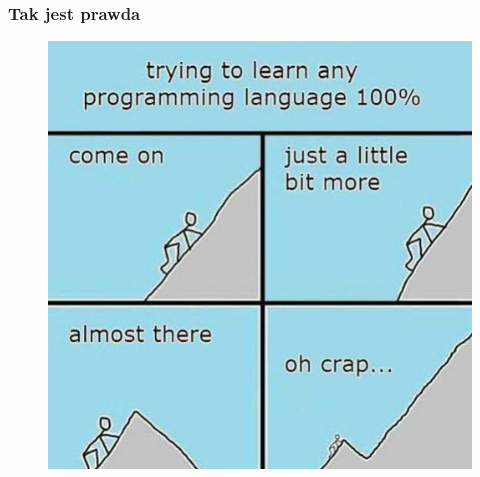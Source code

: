 \documentclass[10pt,t]{beamer}
\begin{document}
\begin{frame}
  \frametitle{Tak jest prawda}

  \vspace{-0.5em}


  \begin{figure}

    \label{fig:Learning-any-language-at-100-procent}

    \centering


    \includegraphics[scale=0.195]
    {./Presentations-pictures/Learning-language-at-100.jpg}

  \end{figure}

\end{frame}
\end{document}

